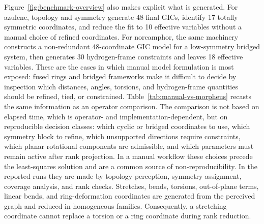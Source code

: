 \documentclass[aip,jcp,reprint,longbibliography,floatfix]{revtex4-2}
\begin{document}
Figure~\ref{fig:benchmark-overview} also makes explicit what is generated.
For azulene, topology and symmetry generate 48 final GICs, identify 17
totally symmetric coordinates, and reduce the fit to 10 effective variables
without a manual choice of refined coordinates. For norcamphor, the same
machinery constructs a non-redundant 48-coordinate GIC model for a
low-symmetry bridged system, then generates 30 hydrogen-frame constraints and
leaves 18 effective variables. These are the cases in which manual model
formulation is most exposed: fused rings and bridged frameworks make it
difficult to decide by inspection which distances, angles, torsions, and
hydrogen-frame quantities should be refined, tied, or constrained.
Table~\ref{tab:manual-vs-morpheus} recasts the same information as an
operator comparison. The comparison is not based on elapsed time, which is
operator- and implementation-dependent, but on reproducible decision classes:
which cyclic or bridged coordinates to use, which symmetry block to refine,
which unsupported directions require constraints, which planar rotational
components are admissible, and which parameters must remain active after rank
projection. In a manual workflow these choices precede the least-squares
solution and are a common source of non-reproducibility. In the reported runs
they are made by topology perception, symmetry assignment, coverage analysis,
and rank checks. Stretches, bends, torsions, out-of-plane terms, linear bends,
and ring-deformation coordinates are generated from the perceived graph and
reduced in homogeneous families. Consequently, a stretching coordinate cannot
replace a torsion or a ring coordinate during rank reduction.
\end{document}
